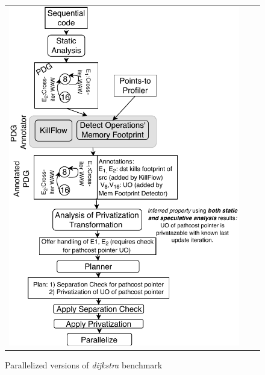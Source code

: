 \begin{figure}
\begin{tabular}{c|c|c}
  \includegraphics[scale=0.5]{figures/compilation_flow_lsd}

\end{tabular}

\caption{Parallelized versions of \textit{dijkstra} benchmark}
\label{fig:dijkstra_parallelized}
\end{figure}


